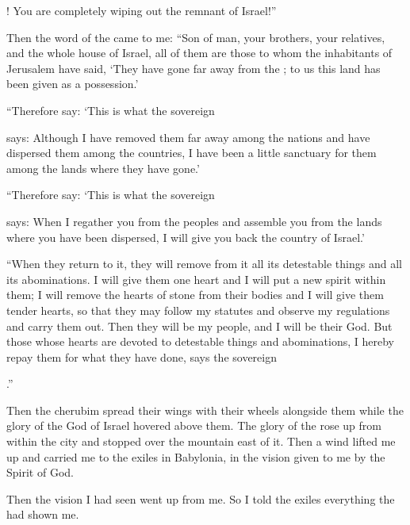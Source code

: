 {{}! You
are completely
wiping out
the remnant
of Israel!”
\par }{\PP {}Then
the word
of the {}
came to me:
“Son
of man,
your brothers,
your relatives,
and the whole
house
of Israel,
all
of them are those to whom
the inhabitants
of Jerusalem
have said,
‘They have gone far away
from
the {}; to us this
land
has been given
as a possession.’
\par }{\PP {}“Therefore
say: ‘This is what
the sovereign

{}
says: Although
I have removed them far away
among the nations
and have dispersed
them among the countries,
I have been
a little
sanctuary
for them among the lands
where
they have gone.’
\par }{\PP {}“Therefore
say: ‘This is what
the sovereign

{}
says: When I regather
you from
the peoples
and assemble
you from
the lands
where
you have been dispersed,
I will give
you back the country
of Israel.’
\par }{\PP {}“When they return
to it, they will remove
from it all
its detestable
things and all
its abominations.
I will give
them one
heart
and I will put
a new
spirit
within
them; I will remove
the hearts
of stone
from their bodies
and I will give
them tender
hearts,
so that they may
follow
my statutes
and observe
my regulations
and carry
them out.
Then
they will be
my people,
and I
will be
their God.
But those whose hearts
are devoted
to detestable things
and abominations,
I hereby repay
them for what they have done,
says
the sovereign

{}.”
\par }{\PP {}Then
the cherubim
spread their wings
with their wheels
alongside
them while the glory
of the God
of Israel
hovered
above them.
The glory
of the {}
rose up
from within
the city
and stopped
over
the mountain
east of it.
Then a wind
lifted
me up
and carried
me to
the exiles
in Babylonia,
in the vision
given to me by the Spirit
of God.
\par }{\PP Then the vision
I had
seen
went up
from me.
So I told
the exiles
everything
the {}
had
shown me.

}
